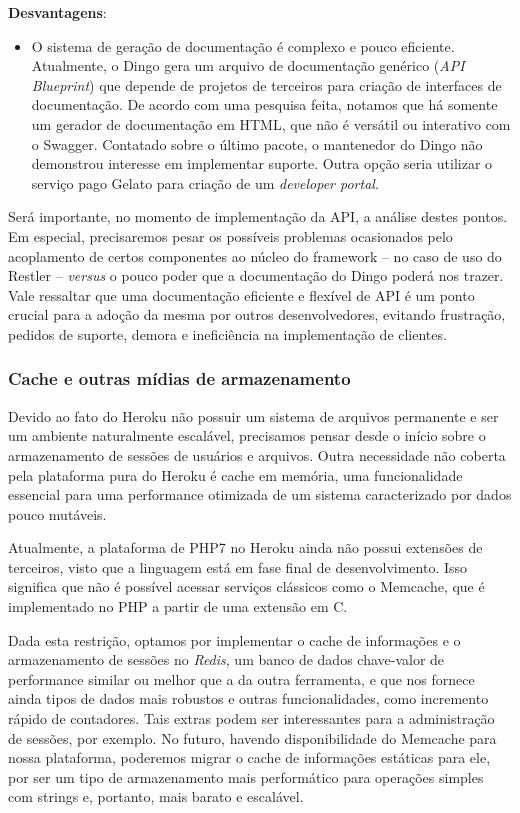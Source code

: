 \documentclass[12pt,a4paper,twoside,hyphens,english,brazil]{abntex2}
\begin{document}
{\begin{description}
		\textbf{Desvantagens}:
		\begin{itemize}[itemsep=-1ex]
			\item O sistema de geração de documentação é complexo e pouco eficiente. Atualmente, o Dingo gera um arquivo de documentação genérico (\emph{API Blueprint}) que depende de projetos de terceiros para criação de interfaces de documentação. De acordo com uma pesquisa feita, notamos que há somente um gerador de documentação em HTML, que não é versátil ou interativo com o Swagger. Contatado sobre o último pacote, o mantenedor do Dingo não demonstrou interesse em implementar suporte\cite{dingo-swagger}. Outra opção seria utilizar o serviço pago Gelato para criação de um \emph{developer portal}.
		\end{itemize}
\end{description}

Será importante, no momento de implementação da API, a análise destes pontos. Em especial, precisaremos pesar os possíveis problemas ocasionados pelo acoplamento de certos componentes ao núcleo do framework -- no caso de uso do Restler -- \emph{versus} o pouco poder que a documentação do Dingo poderá nos trazer. Vale ressaltar que uma documentação eficiente e flexível de API é um ponto crucial para a adoção da mesma por outros desenvolvedores, evitando frustração, pedidos de suporte, demora e ineficiência na implementação de clientes.

\subsubsection{Cache e outras mídias de armazenamento}
Devido ao fato do Heroku não possuir um sistema de arquivos permanente e ser um ambiente naturalmente escalável, precisamos pensar desde o início sobre o armazenamento de sessões de usuários e arquivos. Outra necessidade não coberta pela plataforma pura do Heroku é cache em memória, uma funcionalidade essencial para uma performance otimizada de um sistema caracterizado por dados pouco mutáveis.

Atualmente, a plataforma de PHP7 no Heroku ainda não possui extensões de terceiros, visto que a linguagem está em fase final de desenvolvimento. Isso significa que não é possível acessar serviços clássicos como o Memcache, que é implementado no PHP a partir de uma extensão em C.

Dada esta restrição, optamos por implementar o cache de informações e o armazenamento de sessões no \emph{Redis}, um banco de dados chave-valor de performance similar ou melhor que a da outra ferramenta, e que nos fornece ainda tipos de dados mais robustos e outras funcionalidades, como incremento rápido de contadores\cite{memcached-redis}. Tais extras podem ser interessantes para a administração de sessões, por exemplo. No futuro, havendo disponibilidade do Memcache para nossa plataforma, poderemos migrar o cache de informações estáticas para ele, por ser um tipo de armazenamento mais performático para operações simples com strings e, portanto, mais barato e escalável.

}
\end{document}
